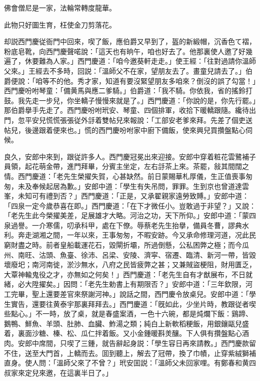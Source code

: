 佛會僧尼是一家，法輪常轉度龍華。

此物只好圖生育，枉使金刀剪落花。

却説西門慶従衙門中回來，喫了飯，應伯爵又早到了，盔的新緞帽，沉香色て褶，粉底皂靴，向西門慶聲喏說：「這天也有晌午，咱也好去了。他那裏使人邀了好幾遍了，休要難為人家。」西門慶道：「咱今邀葵軒走走。」使王經：「往對過請你溫師父來。」王經去不多時，回説：「溫師父不在家，望朋友去了。畫童兒請去了。」伯爵便說：「咱等不的他。秀才家，知道有要沒緊望朋友多咱來？倒沒的誤了勾當！」西門慶吩咐琴童：「備黄馬與應二爹騎。」伯爵道：「我不騎。你依我，省的搖鈴打鼓。我先走一步兒，你坐轎子慢慢來就是了。」西門慶道：「你說的是，你先行罷。」那伯爵擧手先走了。西門慶吩咐玳安、琴童、四個排軍，收拾下暖轎跟隨。纔待出門，忽平安兒慌慌張張従外㧱着雙帖兒來報說：「工部安老爹來拜。先差了個吏送帖兒，後邊跟着便來也。」慌的西門慶吩咐家中廚下備飯，使來興兒買攢盤點心伺候。

良久，安郎中來到，跟従許多人。西門慶冠冕出來迎接。安郎中穿着粧花雲鷺補子員領，起花萌金帶，進門拜畢，分賓主坐定，左右㧱茶上來。茶罷，敍其間闊之情。西門慶道：「老先生榮擢失賀，心甚缺然。前日蒙賜華札厚儀，生正值喪事匆匆，未及奉候起居為歉。」安郎中道：「學生有失吊問，罪罪。生到京也曾道達雲峯，未知可有禮到否？」西門慶道：「正是，又承翟親家遠勞致賻。」安郎中道：「四泉一定今歲恭喜在即。」西門慶道：「在下才微任小。豈敢過于非望？」又說：「老先生此今榮擢美差，足展雄才大略。河治之功，天下所仰。」安郎中道：「蒙四泉過譽。一介寒儒，叨承科甲，處在下僚。辱蔡老先生抬擧，備員冬曹，謬典水利。奔走湖湘之間，一年以來，王事匆匆，不暇安跡。今又承命修理河道，况此民窮財盡之時。前者皇船載運花石，毀閘折壩，所過倒懸，公私困弊之極；而今瓜州、南旺、沽頭、魚臺、徐沛、呂梁、安陵、濟寜、宿遷、臨清、新河一帶，皆毀壞廢圯；南河南徙，淤沙無水，八府之民皆疲弊之甚；又兼賊盜梗阻，財用匱乏，大覃神輸鬼役之才，亦無如之何矣！」西門慶道：「老先生自有才猷展布，不日就緒，必大陞擢矣。」因問：「老先生勅書上有期限否？」安郎中道：「三年欽限，河工完畢，聖上還要差官來祭謝河神。」說話之間，西門慶令放桌兒。安郎中道：「學生實告，還要往黄泰宇那裏拜拜去。」西門慶道：「旣如此，少坐片時，教跟従者喫些點心。」不一時，放了桌，就是春盛案酒，一色十六碗，都是炖爛下飯：鷄蹄、鵝鴨、鮮魚、羊頭、肚肺、血臟、鮓湯之類；純白上新軟稻粳飯，用銀鑲甌兒盛着，裏面沙糖、榛、松、瓜仁拌着飯。又小金鍾暖斟羙釀。下人俱有攢盤點心酒肉。安郎中席間，只喫了三鍾，就告辭起身説：「學生容日再來請教。」西門慶款留不住，送至大門首，上轎而去。囬到聽上，解去了冠帶，換了巾幘，止穿紫絨獅補直身。使人問：「溫師父來了不曾？」玳安囬説：「溫師父未回家哩。有鄭春和黄四叔家來定兒來邀，在這裏半日了。」

